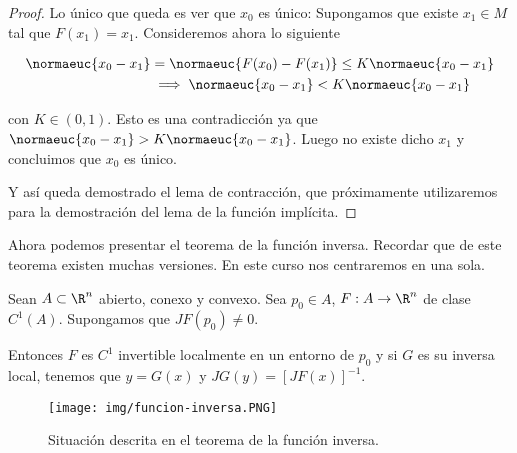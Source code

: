 \begin{proof}
    Lo único que queda es ver que $x_0$ es único: Supongamos que existe $x_1 \in M$ tal que $F(x_1) = x_1$. Consideremos ahora lo siguiente
    
    \begin{align*}
        \normaeuc{x_0 - x_1} &= \normaeuc{F(x_0) - F(x_1)} \leq K\normaeuc{x_0 - x_1} \\
        &\implies \normaeuc{x_0 - x_1} < K\normaeuc{x_0 - x_1}
    \end{align*}
    
    \noindent con $K \in (0,1)$. Esto es una contradicción ya que $\normaeuc{x_0 - x_1} > K\normaeuc{x_0 - x_1}$. Luego no existe dicho $x_1$ y concluimos que $x_0$ es único.
    
    Y así queda demostrado el lema de contracción, que próximamente utilizaremos para la demostración del lema de la función implícita.
\end{proof}

Ahora podemos presentar el teorema de la función inversa. Recordar que de este teorema existen muchas versiones. En este curso nos centraremos en una sola.

\begin{teo}\label{teo:inversa}
    Sean $A \subset \R^n$ abierto, conexo y convexo. Sea $p_0 \in A$, $F: A \rightarrow \R^n$ de clase $C^1(A)$. Supongamos que $JF(p_0) \neq 0$.
    
    Entonces $F$ es $C^1$ invertible localmente en un entorno de $p_0$ y si $G$ es su inversa local, tenemos que $y = G(x)$ y $JG(y) = [JF(x)]^{-1}$.
\end{teo}

\begin{figure}
    \centering
    \texttt{[image: img/funcion-inversa.PNG]}
    \caption{Situación descrita en el teorema de la función inversa.}
\end{figure}

